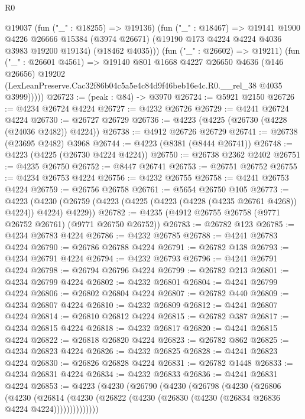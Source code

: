 \begin{lexlean}{R0}
\begin{coremodule}
            @19037
            (fun ("_" : @18255) => @19136)
            (fun ("_" : @18467) =>
            @19141
              @1900
              @4226
              @26666
              @15384
              (@3974 @26671)
              (@19190 @173 @4224 @4224 @4036 @3983 @19200 @19134)
              (@18462 @4035)))
          (fun ("_" : @26602) => @19211)
          (fun ("_" : @26601 @4561) =>
          @19140
            @801
            @1668
            @4227
            @26650
            @4636
            (@146 @26656)
            @19202
            (LexLeanPreserve.Cac32f86b04c5a5e4c84d9f46beb16e4c.R0.__rel_38 @4035 @3999)))))
@26723 := (peak : @84) -> @3970
@26724 := @5921 @2150
@26726 := @4234 @26724 @4224
@26727 := @4232 @26726
@26729 := @4241 @26724 @4224
@26730 := @26727 @26729
@26736 := @4223 (@4225 (@26730 (@4228 (@24036 @2482)) @4224))
@26738 := @4912 @26726 @26729
@26741 := @26738 (@23695 @2482) @3968
@26744 := @4223 (@8381 (@8444 @26741))
@26748 := @4223 (@4225 (@26730 @4224 @4224))
@26750 := @26738 @2362 @2402
@26751 := @4235 @26750
@26752 := @8447 @26741
@26753 := @26751 @26752
@26755 := @4234 @26753 @4224
@26756 := @4232 @26755
@26758 := @4241 @26753 @4224
@26759 := @26756 @26758
@26761 := @5654 @26750 @105
@26773 := @4223
    (@4230 (@26759 (@4223 (@4225 (@4223 (@4228 (@4235 @26761 @4268)) @4224)) @4224) @4229))
@26782 := @4235 (@4912 @26755 @26758 (@9771 @26752 @26761) (@9771 @26750 @26752))
@26783 := @26782 @123
@26785 := @4234 @26783 @4224
@26786 := @4232 @26785
@26788 := @4241 @26783 @4224
@26790 := @26786 @26788 @4224
@26791 := @26782 @138
@26793 := @4234 @26791 @4224
@26794 := @4232 @26793
@26796 := @4241 @26791 @4224
@26798 := @26794 @26796 @4224
@26799 := @26782 @213
@26801 := @4234 @26799 @4224
@26802 := @4232 @26801
@26804 := @4241 @26799 @4224
@26806 := @26802 @26804 @4224
@26807 := @26782 @440
@26809 := @4234 @26807 @4224
@26810 := @4232 @26809
@26812 := @4241 @26807 @4224
@26814 := @26810 @26812 @4224
@26815 := @26782 @387
@26817 := @4234 @26815 @4224
@26818 := @4232 @26817
@26820 := @4241 @26815 @4224
@26822 := @26818 @26820 @4224
@26823 := @26782 @862
@26825 := @4234 @26823 @4224
@26826 := @4232 @26825
@26828 := @4241 @26823 @4224
@26830 := @26826 @26828 @4224
@26831 := @26782 @1448
@26833 := @4234 @26831 @4224
@26834 := @4232 @26833
@26836 := @4241 @26831 @4224
@26853 := @4223
    (@4230
      (@26790
        (@4230
          (@26798
            (@4230
              (@26806
                (@4230
                  (@26814
                    (@4230 (@26822 (@4230 (@26830 (@4230 (@26834 @26836 @4224 @4224))))))))))))))

\end{coremodule}
\end{lexlean}

